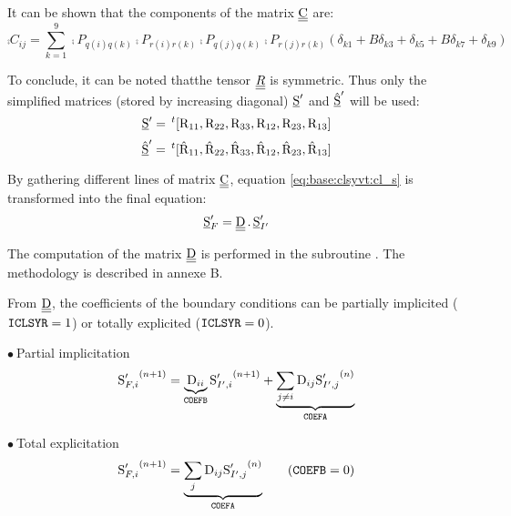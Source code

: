It can be shown that the components of the matrix $\underline{\underline{\textrm{C}}}$ are:
\begin{equation}
\comp{C}_{ij}=\sum_{k=1}^9
\comp{P}_{q(i)q(k)}\comp{P}_{r(i)r(k)}\comp{P}_{q(j)q(k)}\comp{P}_{r(j)r(k)}
(\delta_{k1}+B\delta_{k3}+\delta_{k5}+B\delta_{k7}+\delta_{k9})
\end{equation}

To conclude, it can be noted thatthe tensor  $\underline{\underline{R}}$ is symmetric.
Thus only the simplified matrices (stored by increasing diagonal)
$\underline{\textrm{S}}^\prime$ and $\hat{\underline{\textrm{S}}}^\prime$ will be used:
\begin{equation}
\underline{\textrm{S}}^\prime=\,^t[\textrm{R}_{11},\textrm{R}_{22},\textrm{R}_{33},
\textrm{R}_{12},\textrm{R}_{23},\textrm{R}_{13}]
\end{equation}
\begin{equation}
\hat{\underline{\textrm{S}}}^\prime=\,^t[\hat{\textrm{R}}_{11},\hat{\textrm{R}}_{22},\hat{\textrm{R}}_{33},
\hat{\textrm{R}}_{12},\hat{\textrm{R}}_{23},\hat{\textrm{R}}_{13}]
\end{equation}

By gathering different lines of matrix $\underline{\underline{\textrm{C}}}$, equation
\eqref{eq:base:clsyvt:cl_s} is transformed into the final equation:
\begin{equation}
\underline{\textrm{S}}_F^\prime=\underline{\underline{\textrm{D}}}\,.\,\underline{\textrm{S}}_{I'}^\prime
\end{equation}

The computation of the matrix $\underline{\underline{\textrm{D}}}$ is performed in the subroutine
. The methodology is described in annexe B.

From $\underline{\underline{\textrm{D}}}$, the coefficients of the boundary conditions can be
 partially implicited ($\text{\texttt{ICLSYR}}=1$) or totally explicited
($\text{\texttt{ICLSYR}}=0$).

$\bullet\ ${\sc Partial implicitation}\\
\begin{equation}
\label{Base_Clsyvt_eq_clRimp}
{\textrm{S}_{F,i}^\prime}^{(n+1)} =
\underbrace{\textrm{D}_{ii}}_{\text{\texttt{COEFB}}}{\textrm{S}_{I',i}^\prime}^{(n+1)}
+\underbrace{\sum_{j\ne i}\textrm{D}_{ij}{\textrm{S}_{I',j}^\prime}^{(n)}}_{\text{\texttt{COEFA}}}
\end{equation}

$\bullet\ ${\sc Total explicitation}\\
\begin{equation}
\label{Base_Clsyvt_eq_clRexp}
{\textrm{S}_{F,i}^\prime}^{(n+1)} =
\underbrace{\sum_j\textrm{D}_{ij}{\textrm{S}_{I',j}^\prime}^{(n)}}_{\text{\texttt{COEFA}}}
\qquad(\text{\texttt{COEFB}}=0)
\end{equation}

